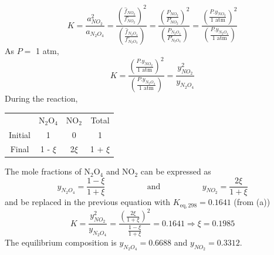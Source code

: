 \documentclass[calculator,steamtables,allquestions,datasheet]{exam_newMarcus2}
\newcommand{\frc}{\displaystyle\frac}
\begin{document}
\begin{question}
\begin{enumerate}[(a)]
{             \begin{displaymath} 
                 K = \frc{a^{2}_{NO_{2}}}{a_{N_{2}O_{4}}} = \frc{\left(\frc{\hat{f}_{NO_{2}}}{f^{\circ}_{NO_{2}}}\right)^{2}}{\left(\frc{\hat{f}_{N_{2}O_{4}}}{f^{\circ}_{N_{2}O_{4}}}\right)} = \frc{\left(\frc{P_{NO_{2}}}{P^{\circ}_{NO_{2}}}\right)^{2}}{\left(\frc{P_{N_{2}O_{4}}}{P^{\circ}_{N_{2}O_{4}}}\right)} = \frc{\left(\frc{P.y_{NO_{2}}}{1\text{ atm}}\right)^{2}}{\left(\frc{P.y_{N_{2}O_{4}}}{1 \text{ atm}}\right)}  
             \end{displaymath}
             As $P=$ 1 atm,~
             \begin{displaymath} 
                 K = \frc{\left(\frc{P.y_{NO_{2}}}{1\text{ atm}}\right)^{2}}{\left(\frc{P.y_{N_{2}O_{4}}}{1 \text{ atm}}\right)}  = \frc{y^{2}_{NO_{2}}}{y_{N_{2}O_{4}}} 
             \end{displaymath}
             During the reaction,~
              \begin{center}
                   \begin{tabular}{c | c c c}
                                   & N$_{2}$O$_{4}$  & NO$_{2}$  & Total \\
                         Initial   &  1            &  0        &  1    \\
                         Final     &  1 - $\xi$    &  2$\xi$   & 1 + $\xi$       
                   \end{tabular}
              \end{center}
              The mole fractions of N$_{2}$O$_{4}$ and NO$_{2}$ can be expressed as~
              \begin{displaymath}
                  y_{N_{2}O_{4}} = \frc{1-\xi}{1+\xi} \hspace{2cm}\text{ and }\hspace{2cm} y_{NO_{2}}= \frc{2\xi}{1+\xi}
              \end{displaymath}
              and be replaced in the previous equation with $K_{\text{eq},298}= 0.1641$ (from (a))~
              \begin{displaymath}
                 K =  \frc{y^{2}_{NO_{2}}}{y_{N_{2}O_{4}}} = \frc{\left(\frc{2\xi}{1+\xi}\right)^{2}}{\frc{1-\xi}{1+\xi}} = 0.1641 \Longrightarrow \xi = 0.1985
             \end{displaymath}
            The equilibrium composition is $y_{N_{2}O_{4}}=0.6688$ and $y_{NO_{2}}=0.3312$.~
}
%
  \end{enumerate}
%


\end{question}
\end{document}
